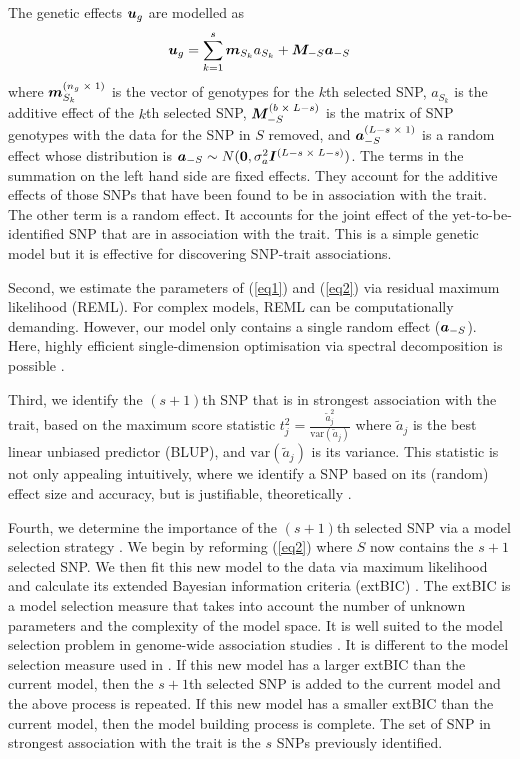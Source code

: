 \documentclass{nature}
\begin{document}
The genetic effects $\bm{u}_g$ are modelled as 
\begin{equation}
\label{eq2}
\bm{u}_g = \sum_{k=1}^s  \bm{m}_{S_k} a_{S_k} +\bm{M}_{-S} \bm{a}_{-S}
\end{equation}
where $\bm{m}_{S_k}^{(n_g \; \times \; 1)}$ is the vector of genotypes for the  $k$th selected SNP, 
$a_{S_k}$ is the additive effect of the $k$th selected SNP, $\bm{M}_{-S}^{(b \; \times \; L-s)}$ is the matrix of  SNP genotypes 
with the data for the SNP in $S$ removed,  and $\bm{a}_{-S}^{(L-s \; \times  \; 1)}$ is a random effect whose distribution is 
$\bm{a}_{-S} \sim N(\bm{0}, \sigma_a^2 \bm{I}^{(L-s \; \times \;  L-s)})$. 
The terms in the summation on the left hand side are fixed effects.   They account 
for the additive effects of those SNPs that have been found to be in association with the trait. The other term is a random effect. 
It accounts for the joint effect of the yet-to-be-identified SNP that are in association with the trait. 
This is a simple genetic model but it 
is effective for discovering SNP-trait associations. 


Second, we estimate the parameters of (\ref{eq1}) and (\ref{eq2}) via residual maximum likelihood (REML).  For complex models, REML
can be computationally demanding. However, our model only contains a single random effect ($\bm{a}_{-S}$). Here, highly efficient single-dimension 
optimisation via spectral decomposition is possible \cite{kang2008efficient}. 

Third, we identify the $(s+1)$th SNP that is in strongest association with the trait, based on the maximum score statistic
$t_j^2 = \frac{ \widetilde{a} _j^2}{\textrm{var}(\widetilde{a}_j)}$ where $\widetilde{a}_j$ is the best linear unbiased predictor (BLUP), 
and $\textrm{var}(\widetilde{a}_j)$ is its variance. This statistic is not only appealing intuitively, where we 
identify a SNP based on its (random) effect size and accuracy, but is justifiable, theoretically \cite{verbyla2012rwgaim}.

Fourth, we determine the importance of the $(s+1)$th selected SNP via a model selection strategy  \cite{verbyla2007analysis}. 
We begin by reforming (\ref{eq2}) where $S$ now contains the $s + 1$ selected SNP.  We then fit this new model to the data
via maximum likelihood and calculate its extended Bayesian information criteria (extBIC) \cite{chen2008extended}.  The 
extBIC is a model selection measure that takes into account the number of unknown parameters and the complexity 
of the model space.  It is well suited to the model selection problem in genome-wide association studies \cite{chen2008extended}. 
It is different to the model selection measure used in  \cite{verbyla2007analysis}.
If this new model has a larger extBIC than the current model, then the $s+1$th selected SNP is added to 
the current model and the above process is repeated. If this new model has a smaller extBIC than the current model, then the 
model building process is complete. The set of SNP in strongest association with the trait is the $s$ SNPs previously identified. 
\end{document}
